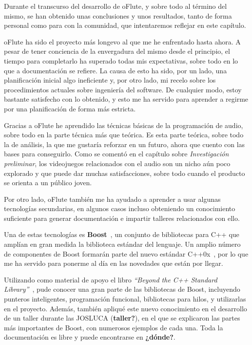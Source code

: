 Durante el transcurso del desarrollo de oFlute, y sobre todo al término del
mismo, se han obtenido unas conclusiones y unos resultados, tanto de forma
personal como para con la comunidad, que intentaremos reflejar en este capítulo.

oFlute ha sido el proyecto más longevo al que me he enfrentado hasta ahora. A
pesar de tener conciencia de la envergadura del mismo desde el principio, el
tiempo para completarlo ha superado todas mis expectativas, sobre todo en lo que
a documentación se refiere. La causa de esto ha sido, por un lado, una
planificación inicial algo ineficiente y, por otro lado, mi recelo sobre los
procedimientos actuales sobre ingeniería del software. De cualquier modo, estoy
bastante satisfecho con lo obtenido, y esto me ha servido para aprender a
regirme por una planificación de forma más estricta.

Gracias a oFlute he aprendido las técnicas básicas de la programación de audio,
sobre todo en la parte técnica más que teórica. Es esta parte teórica, sobre
todo la de análisis, la que me gustaría reforzar en un futuro, ahora que cuento
con las bases para conseguirlo. Como se comentó en el capítulo sobre
\textit{Investigación preliminar}, los videojuegos relacionados con el audio son
un nicho aún poco explorado y que puede dar muchas satisfacciones, sobre todo
cuando el producto se orienta a un público joven.

Por otro lado, oFlute también me ha ayudado a aprender a usar algunas
tecnologías secundarias, en algunos casos incluso obteniendo un conocimiento
suficiente para generar documentación e impartir talleres relacionados con ello.

Una de estas tecnologías es \textbf{Boost}~\cite{boost}, un conjunto de
bibliotecas para C++ que amplían en gran medida la biblioteca estándar del
lenguaje. Un amplio número de componentes de Boost formarán parte del nuevo
estándar C++0x~\cite{cpp0x}, por lo que me ha servido para ponerme al día en las
novedades que están por llegar. 

Utilizando como material de apoyo el libro \textit{``Beyond the C++ Standard
  Library''}~\cite{libroboost}, pude conocer una gran parte de las bibliotecas
de Boost, incluyendo punteros inteligentes, programación funcional, bibliotecas
para hilos, y utilizarlas en el proyecto. Además, también apliqué este nuevo
conocimiento en el desarrollo de un taller durante las JOSLUCA
(\textbf{taller?}), en el que se explicaron las partes más importantes de Boost,
con numerosos ejemplos de cada una. Toda la documentación es libre y puede
encontrarse en {\Large\textbf{¿dónde?}}.


